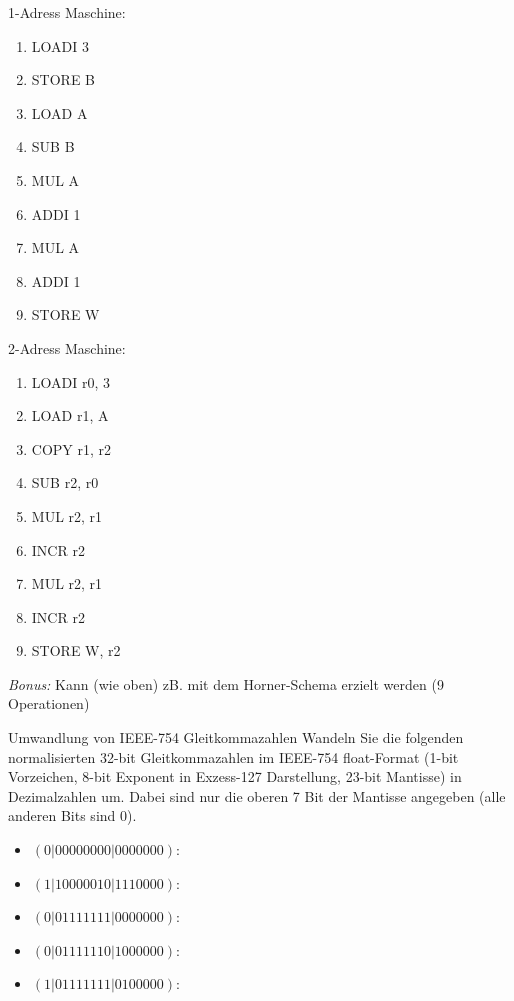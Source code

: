 \documentclass{exercisesheet}
\begin{document}
  \begin{solution*}
    \begin{multicols*}{2}
      1-Adress Maschine:
      \begin{enumerate}
        \item LOADI 3
        \item STORE B
        \item LOAD A
        \item SUB B
        \item MUL A
        \item ADDI 1
        \item MUL A
        \item ADDI 1
        \item STORE W
      \end{enumerate}

      2-Adress Maschine:
      \begin{enumerate}
        \item LOADI r0, 3
        \item LOAD r1, A
        \item COPY r1, r2
        \item SUB r2, r0
        \item MUL r2, r1
        \item INCR r2
        \item MUL r2, r1
        \item INCR r2
        \item STORE W, r2
      \end{enumerate}
    \end{multicols*}

    \textit{Bonus:} Kann (wie oben) zB. mit dem Horner-Schema erzielt werden (9 Operationen)
  \end{solution*}

  \begin{exercise*}[4]{Umwandlung von IEEE-754 Gleitkommazahlen}
    Wandeln Sie die folgenden normalisierten 32-bit Gleitkommazahlen im IEEE-754 float-Format (1-bit Vorzeichen, 8-bit Exponent in Exzess-127 Darstellung, 23-bit Mantisse) in Dezimalzahlen um. Dabei sind nur die oberen 7 Bit der Mantisse angegeben (alle anderen Bits sind 0).
      \begin{itemize}
        \item $(0|0000 0000|0000 000)$:
        \item $(1|1000 0010|1110 000)$:
        \item $(0|0111 1111|0000 000)$:
        \item $(0|0111 1110|1000 000)$:
        \item $(1|0111 1111|0100 000)$:
      \end{itemize}
  \end{exercise*}
\end{document}
